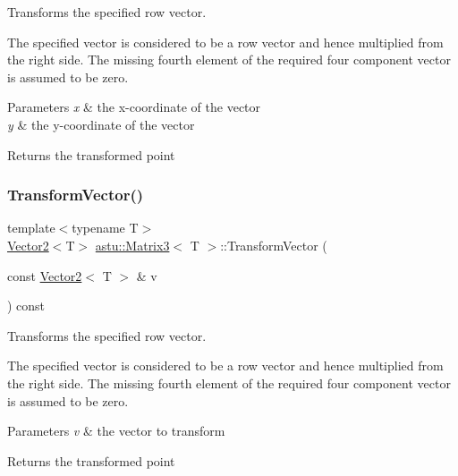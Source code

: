 Transforms the specified row vector.

The specified vector is considered to be a row vector and hence multiplied from the right side. The missing fourth element of the required four component vector is assumed to be zero.


\begin{DoxyParams}{Parameters}
{\em x} & the x-\/coordinate of the vector \\
\hline
{\em y} & the y-\/coordinate of the vector \\
\hline
\end{DoxyParams}
\begin{DoxyReturn}{Returns}
the transformed point 
\end{DoxyReturn}
\mbox{\label{classastu_1_1Matrix3_a5f64a156008433283fc2de9ee54604da}} 
\subsubsection{\texorpdfstring{Transform\+Vector()}{TransformVector()}\hspace{0.1cm}{\footnotesize\ttfamily [2/2]}}
{\footnotesize\ttfamily template$<$typename T$>$ \\
\hyperlink{classastu_1_1Vector2}{Vector2}$<$T$>$ \hyperlink{classastu_1_1Matrix3}{astu\+::\+Matrix3}$<$ T $>$\+::Transform\+Vector (\begin{DoxyParamCaption}\item[{const \hyperlink{classastu_1_1Vector2}{Vector2}$<$ T $>$ \&}]{v }\end{DoxyParamCaption}) const\hspace{0.3cm}{\ttfamily [inline]}}

Transforms the specified row vector.

The specified vector is considered to be a row vector and hence multiplied from the right side. The missing fourth element of the required four component vector is assumed to be zero.


\begin{DoxyParams}{Parameters}
{\em v} & the vector to transform \\
\hline
\end{DoxyParams}
\begin{DoxyReturn}{Returns}
the transformed point 
\end{DoxyReturn}
\mbox{\label{classastu_1_1Matrix3_a9b06117981102b5fbf4b0b8fc61e697c}} 
